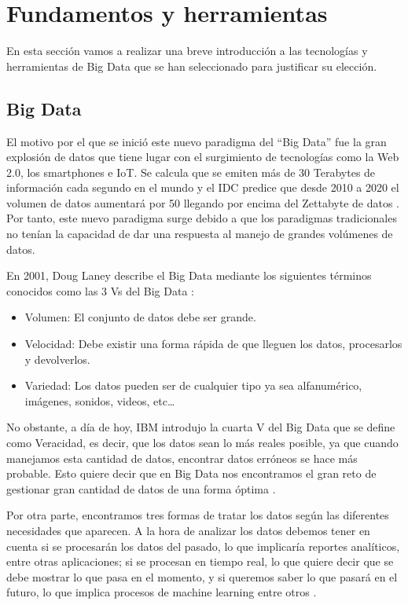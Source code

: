 \chapter{Fundamentos y herramientas\label{FunAndTools}}

En esta sección vamos a realizar una breve introducción a las
tecnologías y herramientas de Big Data que se han seleccionado para
justificar su elección.

\section{Big Data\label{WhatIsBigD}}

El motivo por el que se inició este nuevo paradigma del “Big Data” fue
la gran explosión de datos que tiene lugar con el surgimiento
de tecnologías como la Web 2.0, los smartphones e IoT. Se calcula que
se emiten más de 30 Terabytes de información cada segundo en el mundo
\cite{BD-2} y el IDC predice que desde 2010 a 2020 el volumen de datos
aumentará por 50 llegando por encima del Zettabyte de datos
\cite{BD-2}. Por tanto, este nuevo paradigma surge debido a que los
paradigmas tradicionales no tenían la capacidad de dar una respuesta
al manejo de grandes volúmenes de datos.

En 2001, Doug Laney describe el Big Data mediante los siguientes términos
conocidos como las 3 Vs del Big Data \cite{BD-4}:

\begin{itemize}
\item Volumen: El conjunto de datos debe ser grande.
\item Velocidad: Debe existir una forma rápida de que lleguen los datos,
  procesarlos y devolverlos.
\item Variedad: Los datos pueden ser de cualquier tipo ya sea alfanumérico,
  imágenes, sonidos, videos, etc…
\end{itemize}

No obstante, a día de hoy, IBM introdujo la cuarta V del Big Data que se
define como Veracidad, es decir, que los datos sean lo más reales posible,
ya que cuando manejamos esta cantidad de datos, encontrar datos erróneos se
hace más probable. Esto quiere decir que en Big Data nos encontramos el
gran reto de gestionar gran cantidad de datos de una forma óptima
\cite{BD-5}.

Por otra parte, encontramos tres formas de tratar los datos según las
diferentes necesidades que aparecen. A la hora de analizar los datos
debemos tener en cuenta si se procesarán los datos del pasado, lo que
implicaría reportes analíticos, entre otras aplicaciones; si se procesan en
tiempo real, lo que quiere decir que se debe mostrar lo que pasa en el
momento, y si queremos saber lo que pasará en el futuro, lo que implica
procesos de machine learning entre otros \cite{BD-3}.

